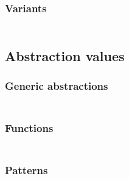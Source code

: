 \subsubsection*{Variants}\hypertarget{variants}{}\label{variants}

\begin{align*}
  [ ~ 
  \KEY{Datatype} ~ & \NAMEHYPER{../../../../../Funcons-beta/Values/Composite}{Variants}{variants} \\
  \KEY{Funcon} ~ & \NAMEHYPER{../../../../../Funcons-beta/Values/Composite}{Variants}{variant}
  ~ ]
\end{align*}
\subsection*{Abstraction values}\hypertarget{abstraction-values}{}\label{abstraction-values}

\subsubsection*{Generic abstractions}\hypertarget{generic-abstractions}{}\label{generic-abstractions}

\begin{align*}
  [ ~ 
  \KEY{Funcon} ~ & \NAMEHYPER{../../../../../Funcons-beta/Values/Abstraction}{Generic}{abstraction} \\
  \KEY{Funcon} ~ & \NAMEHYPER{../../../../../Funcons-beta/Values/Abstraction}{Generic}{closure}
  ~ ]
\end{align*}
\subsubsection*{Functions}\hypertarget{functions}{}\label{functions}

\begin{align*}
  [ ~ 
  \KEY{Datatype} ~ & \NAMEHYPER{../../../../../Funcons-beta/Values/Abstraction}{Functions}{functions} \\
  \KEY{Funcon} ~ & \NAMEHYPER{../../../../../Funcons-beta/Values/Abstraction}{Functions}{function} \\
  \KEY{Funcon} ~ & \NAMEHYPER{../../../../../Funcons-beta/Values/Abstraction}{Functions}{apply} \\
  \KEY{Funcon} ~ & \NAMEHYPER{../../../../../Funcons-beta/Values/Abstraction}{Functions}{curry}
  ~ ]
\end{align*}
\subsubsection*{Patterns}\hypertarget{patterns}{}\label{patterns}

